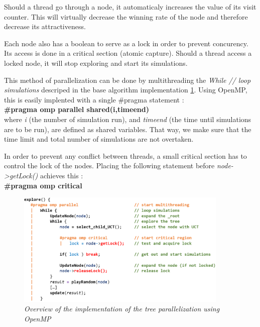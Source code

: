 Should a thread go through a node, it automaticaly increases the value of its visit counter. This will virtually decrease the winning rate of the node and therefore decrease its attractiveness.

Each node also has a boolean to serve as a lock in order to prevent concurency. Its access is done in a critical section (atomic capture). Should a thread access a locked node, it will stop exploring and start its simulations.

This method of parallelization can be done by multithreading the \textit{While // loop simulations} descriped in the base algorithm implementation \ref{fig:MCTSAlgorithmOMP}. Using OpenMP, this is easily implented with a single \#pragma statement :\\
\textbf{\#pragma omp parallel shared(i,timeend)}\\
where \textit{i} (the number of simulation run), and \textit{timeend} (the time until simulations are to be run), are defined as shared variables. That way, we make sure that the time limit and total number of simulations are not overtaken. 

In order to prevent any conflict between threads, a small critical section has to control the lock of the nodes. Placing the following statement before \textit{node->getLock()} achieves this :\\
\textbf{\#pragma omp critical}

\begin{figure}[H]
\centerline{\includegraphics[width=0.9\textwidth]{Parallelisation/Computer/Img/omp.png}}
\caption{\label{fig:MCTSAlgorithmOMP}\textit{Overview of the implementation of the tree parallelization using OpenMP}}
\end{figure}
